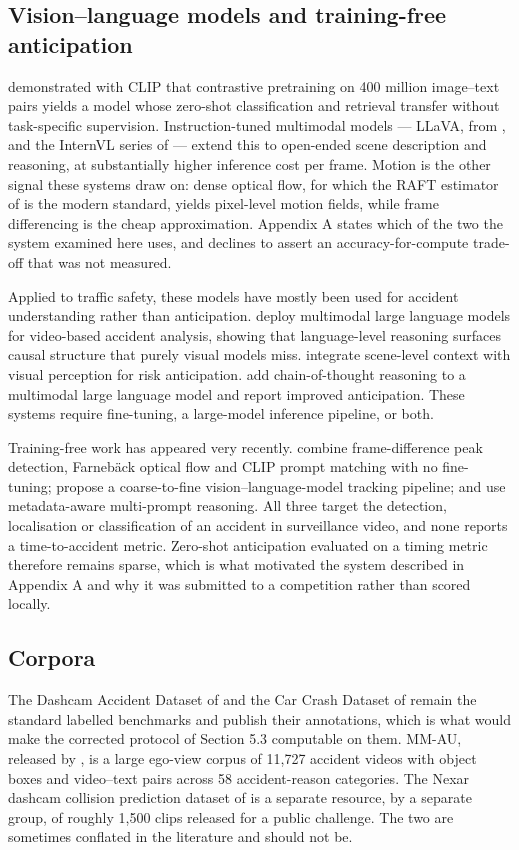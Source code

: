 \subsection{Vision--language models and training-free anticipation}
\citet{radford2021clip} demonstrated with CLIP that contrastive pretraining on 400 million image--text pairs yields a model whose zero-shot classification and retrieval transfer without task-specific supervision. Instruction-tuned multimodal models --- LLaVA, from \citet{liu2023llava}, and the InternVL series of \citet{chen2024internvl} --- extend this to open-ended scene description and reasoning, at substantially higher inference cost per frame. Motion is the other signal these systems draw on: dense optical flow, for which the RAFT estimator of \citet{teed2020raft} is the modern standard, yields pixel-level motion fields, while frame differencing is the cheap approximation. Appendix A states which of the two the system examined here uses, and declines to assert an accuracy-for-compute trade-off that was not measured.

Applied to traffic safety, these models have mostly been used for accident understanding rather than anticipation. \citet{zhang2025seeunsafe} deploy multimodal large language models for video-based accident analysis, showing that language-level reasoning surfaces causal structure that purely visual models miss. \citet{zhang2025camera} integrate scene-level context with visual perception for risk anticipation. \citet{liao2025cot} add chain-of-thought reasoning to a multimodal large language model and report improved anticipation. These systems require fine-tuning, a large-model inference pipeline, or both.

Training-free work has appeared very recently. \citet{thakur2026modular} combine frame-difference peak detection, Farnebäck optical flow and CLIP prompt matching with no fine-tuning; \citet{saha2026zeroshot} propose a coarse-to-fine vision--language-model tracking pipeline; and \citet{singh2026metadata} use metadata-aware multi-prompt reasoning. All three target the detection, localisation or classification of an accident in surveillance video, and none reports a time-to-accident metric. Zero-shot anticipation evaluated on a timing metric therefore remains sparse, which is what motivated the system described in Appendix A and why it was submitted to a competition rather than scored locally.

\subsection{Corpora}
The Dashcam Accident Dataset of \citet{chan2016dad} and the Car Crash Dataset of \citet{bao2020ccd} remain the standard labelled benchmarks and publish their annotations, which is what would make the corrected protocol of Section 5.3 computable on them. MM-AU, released by \citet{fang2024mmau}, is a large ego-view corpus of 11,727 accident videos with object boxes and video--text pairs across 58 accident-reason categories. The Nexar dashcam collision prediction dataset of \citet{moura2025nexar} is a separate resource, by a separate group, of roughly 1,500 clips released for a public challenge. The two are sometimes conflated in the literature and should not be.


